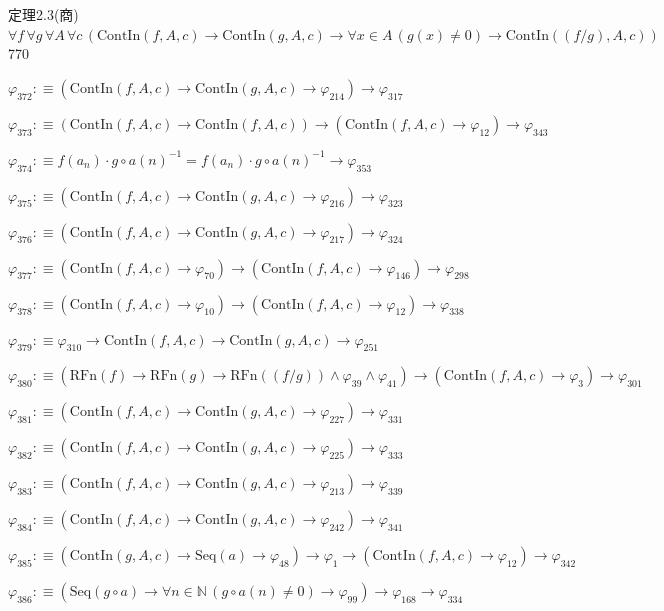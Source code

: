 \begin{fullproof}{定理2.3(商)}{$\forall f\,\forall g\,\forall A\,\forall c\,(\mathrm{ContIn}(f,A,c) \to \mathrm{ContIn}(g,A,c) \to \forall x \in A\,(g(x) \neq 0) \to \mathrm{ContIn}((f / g),A,c))$}{770}
\begin{abbrevlist}
\item $\varphi_{372} :\equiv (\mathrm{ContIn}(f,A,c) \to \mathrm{ContIn}(g,A,c) \to \varphi_{214}) \to \varphi_{317}$
\item $\varphi_{373} :\equiv (\mathrm{ContIn}(f,A,c) \to \mathrm{ContIn}(f,A,c)) \to (\mathrm{ContIn}(f,A,c) \to \varphi_{12}) \to \varphi_{343}$
\item $\varphi_{374} :\equiv f(a_{n}) \cdot g \circ a(n)^{-1} = f(a_{n}) \cdot g \circ a(n)^{-1} \to \varphi_{353}$
\item $\varphi_{375} :\equiv (\mathrm{ContIn}(f,A,c) \to \mathrm{ContIn}(g,A,c) \to \varphi_{216}) \to \varphi_{323}$
\item $\varphi_{376} :\equiv (\mathrm{ContIn}(f,A,c) \to \mathrm{ContIn}(g,A,c) \to \varphi_{217}) \to \varphi_{324}$
\item $\varphi_{377} :\equiv (\mathrm{ContIn}(f,A,c) \to \varphi_{70}) \to (\mathrm{ContIn}(f,A,c) \to \varphi_{146}) \to \varphi_{298}$
\item $\varphi_{378} :\equiv (\mathrm{ContIn}(f,A,c) \to \varphi_{10}) \to (\mathrm{ContIn}(f,A,c) \to \varphi_{12}) \to \varphi_{338}$
\item $\varphi_{379} :\equiv \varphi_{310} \to \mathrm{ContIn}(f,A,c) \to \mathrm{ContIn}(g,A,c) \to \varphi_{251}$
\item $\varphi_{380} :\equiv (\mathrm{RFn}(f) \to \mathrm{RFn}(g) \to \mathrm{RFn}((f / g)) \land \varphi_{39} \land \varphi_{41}) \to (\mathrm{ContIn}(f,A,c) \to \varphi_{3}) \to \varphi_{301}$
\item $\varphi_{381} :\equiv (\mathrm{ContIn}(f,A,c) \to \mathrm{ContIn}(g,A,c) \to \varphi_{227}) \to \varphi_{331}$
\item $\varphi_{382} :\equiv (\mathrm{ContIn}(f,A,c) \to \mathrm{ContIn}(g,A,c) \to \varphi_{225}) \to \varphi_{333}$
\item $\varphi_{383} :\equiv (\mathrm{ContIn}(f,A,c) \to \mathrm{ContIn}(g,A,c) \to \varphi_{213}) \to \varphi_{339}$
\item $\varphi_{384} :\equiv (\mathrm{ContIn}(f,A,c) \to \mathrm{ContIn}(g,A,c) \to \varphi_{242}) \to \varphi_{341}$
\item $\varphi_{385} :\equiv (\mathrm{ContIn}(g,A,c) \to \mathrm{Seq}(a) \to \varphi_{48}) \to \varphi_{1} \to (\mathrm{ContIn}(f,A,c) \to \varphi_{12}) \to \varphi_{342}$
\item $\varphi_{386} :\equiv (\mathrm{Seq}(g \circ a) \to \forall n \in \mathbb{N}\,(g \circ a(n) \neq 0) \to \varphi_{99}) \to \varphi_{168} \to \varphi_{334}$

\end{abbrevlist}
\end{fullproof}
